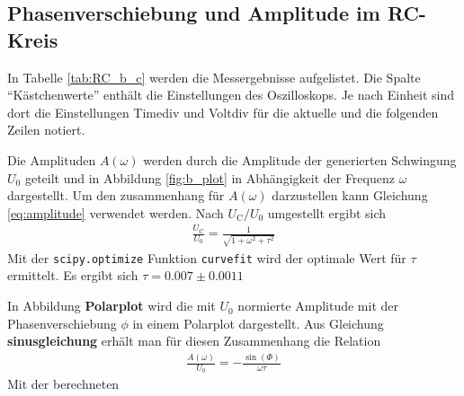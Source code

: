 \subsection{Phasenverschiebung und Amplitude im RC-Kreis}
In Tabelle \ref{tab:RC_b_c} werden die Messergebnisse aufgelistet. 
Die Spalte \enquote{Kästchenwerte} enthält die Einstellungen des Oszilloskops.
Je nach Einheit sind dort die Einstellungen Timediv und Voltdiv für die aktuelle und die folgenden Zeilen notiert.
%

%
Die Amplituden $A(\omega)$ werden durch die Amplitude der generierten Schwingung $U_0$ geteilt und in Abbildung \ref{fig:b_plot}
in Abhängigkeit der Frequenz $\omega$ dargestellt.
Um den zusammenhang für $A(\omega)$ darzustellen kann Gleichung \ref{eq:amplitude} verwendet werden.
Nach $U_\text{C} / U_0$ umgestellt ergibt sich
\begin{align*}
    \frac{U_\text{C}}{U_0} = \frac{1}{\sqrt{1 + \omega^2 + \tau^2}}
\end{align*}
Mit der \texttt{scipy.optimize} Funktion \texttt{curvefit} \cite{scipy} wird der optimale Wert für $\tau$ ermittelt.
Es ergibt sich $\tau = \num{0.007}\pm \num{0.0011}$






In Abbildung \textbf{Polarplot} wird die mit $U_0$ normierte Amplitude mit der Phasenverschiebung $\phi$ in einem Polarplot dargestellt.
Aus Gleichung \textbf{sinusgleichung} erhält man für diesen Zusammenhang die Relation
\begin{align*}
    \frac{A(\omega)}{U_0} = - \frac{\sin(\Phi)}{\omega \tau}
\end{align*}
Mit der berechneten 